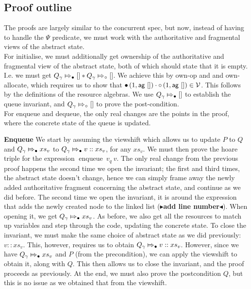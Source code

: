 \documentclass[twoside,11pt,openright]{report}
\newcommand{\enqueue}{\operatorname{enqueue}}
\newcommand{\Qg}{Q_\gname}
\newcommand{\Vl}{\ensuremath{\mathcal{V}}}
\newcommand{\abstractstatefullfrag}[2]{#1 \Mapsto_{\circ} #2}
\newcommand{\abstractstateauth}[2]{#1 \Mapsto_{\bullet} #2}
\newcommand{\todo}[1]{{\color[rgb]{.5,0,0}\textbf{$\blacktriangleright$#1$\blacktriangleleft$}}}
\begin{document}
\subsection{Proof outline}
The proofs are largely similar to the concurrent spec, but now, instead of having to handle the $\Psi$ predicate, we must work with the authoritative and fragmental views of the abstract state.\\
For initialise, we must additionally get ownership of the authoritative and fragmental view of the abstract state, both of which should state that it is empty. I.e. we must get $\abstractstateauth{\Qg}{[]} \star \abstractstatefullfrag{\Qg}{[]}$. We achieve this by own-op and and own-allocate, which requires us to show that $\authfull (1, \aginj\ []) \mtimes \authfrag (1, \aginj\ []) \in \Vl$. This follows by the definitions of the resource algebras. We use $\abstractstateauth{\Qg}{[]}$ to establish the queue invariant, and $\abstractstatefullfrag{\Qg}{[]}$ to prove the post-condition.\\
For enqueue and dequeue, the only real changes are the points in the proof, where the concrete state of the queue is updated.

\textbf{Enqueue} We start by assuming the viewshift which allows us to update $P$ to $Q$ and $\abstractstateauth{\Qg}{xs_v}$ to $\abstractstateauth{\Qg}{v :: xs_v}$, for any $xs_v$. We must then prove the hoare triple for the expression $\enqueue \ v_q \ v$. The only real change from the previous proof happens the second time we open the invariant; the first and third times, the abstract state doesn't change, hence we can simply frame away the newly added authoritative fragment concerning the abstract state, and continue as we did before. The second time we open the invariant, it is around the expression that adds the newly created node to the linked list (\todo{add line number}). When opening it, we get $\abstractstateauth{\Qg}{xs_v}$. As before, we also get all the resources to match up variables and step through the code, updating the concrete state. To close the invariant, we must make the same choice of abstract state as we did previously: $v :: xs_v$. This, however, requires us to obtain $\abstractstateauth{\Qg}{v :: xs_v}$. However, since we have $\abstractstateauth{\Qg}{xs_v}$ and $P$ (from the precondition), we can apply the viewshift to obtain it, along with $Q$. This then allows us to close the invariant, and the proof proceeds as previously. At the end, we must also prove the postcondition $Q$, but this is no issue as we obtained that from the viewshift.
\end{document}
